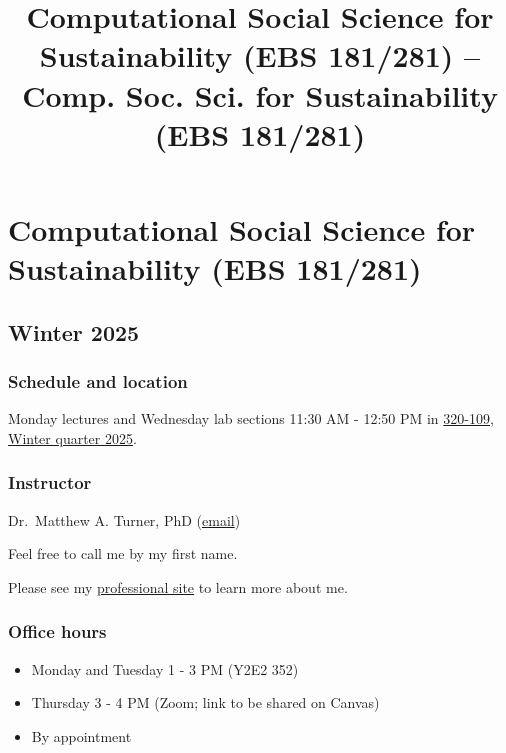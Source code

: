 \documentclass[
]{article}
\title{Computational Social Science for Sustainability (EBS 181/281) --
Comp. Soc. Sci. for Sustainability (EBS 181/281)}
\author{}
\date{}
\providecommand{\tightlist}{%
  \setlength{\itemsep}{0pt}\setlength{\parskip}{0pt}}
\begin{document}
\maketitle

\label{quarto-document-content}
\label{title-block-header}
\section{Computational Social Science for Sustainability (EBS
181/281)}\label{computational-social-science-for-sustainability-ebs-181281}

\subsection{Winter 2025}\label{winter-2025}

\subsubsection{Schedule and location}\label{schedule-and-location}

Monday lectures and Wednesday lab sections 11:30 AM - 12:50 PM in
\href{https://campus-map.stanford.edu/?srch=320-109\#}{320-109},
\href{https://studentservices.stanford.edu/calendar/academic-dates/stanford-academic-calendar-2024-2025\#winter25}{Winter
quarter 2025}.

\subsubsection{Instructor}\label{instructor}

Dr.~Matthew A. Turner, PhD (\href{mailto:maturner@stanford.edu}{email})

Feel free to call me by my first name.

Please see my \href{https://mt.digital}{professional site} to learn more
about me.

\subsubsection{Office hours}\label{office-hours}

\begin{itemize}
\tightlist
\item
  Monday and Tuesday 1 - 3 PM (Y2E2 352)
\item
  Thursday 3 - 4 PM (Zoom; link to be shared on Canvas)
\item
  By appointment
\end{itemize}
\end{document}
